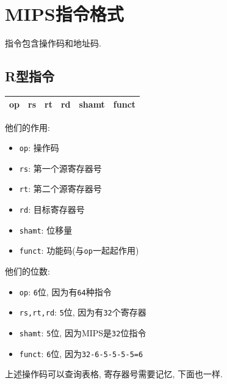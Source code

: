 \section{MIPS指令格式}
指令包含操作码和地址码.
\subsection{R型指令}
\begin{table}[H]
\centering
\begin{tabularx}{\textwidth}{|Z|Z|Z|Z|Z|Z|}
\hline
op & rs & rt & rd & shamt & funct  \\
\hline
\end{tabularx}
\end{table} \par 
他们的作用:
\begin{itemize}
\item \verb|op|: 操作码
\item \verb|rs|: 第一个源寄存器号
\item \verb|rt|: 第二个源寄存器号
\item \verb|rd|: 目标寄存器号
\item \verb|shamt|: 位移量
\item \verb|funct|: 功能码(与\verb|op|一起起作用)
\end{itemize} \par 
他们的位数:
\begin{itemize}
\item \verb|op|: \verb|6|位, 因为有\verb|64|种指令
\item \verb|rs,rt,rd|: \verb|5|位, 因为有\verb|32|个寄存器
\item \verb|shamt|: \verb|5|位, 因为MIPS是\verb|32|位指令
\item \verb|funct|: \verb|6|位, 因为\verb|32-6-5-5-5-5=6|
\end{itemize}\par
上述操作码可以查询表格, 寄存器号需要记忆, 下面也一样.
